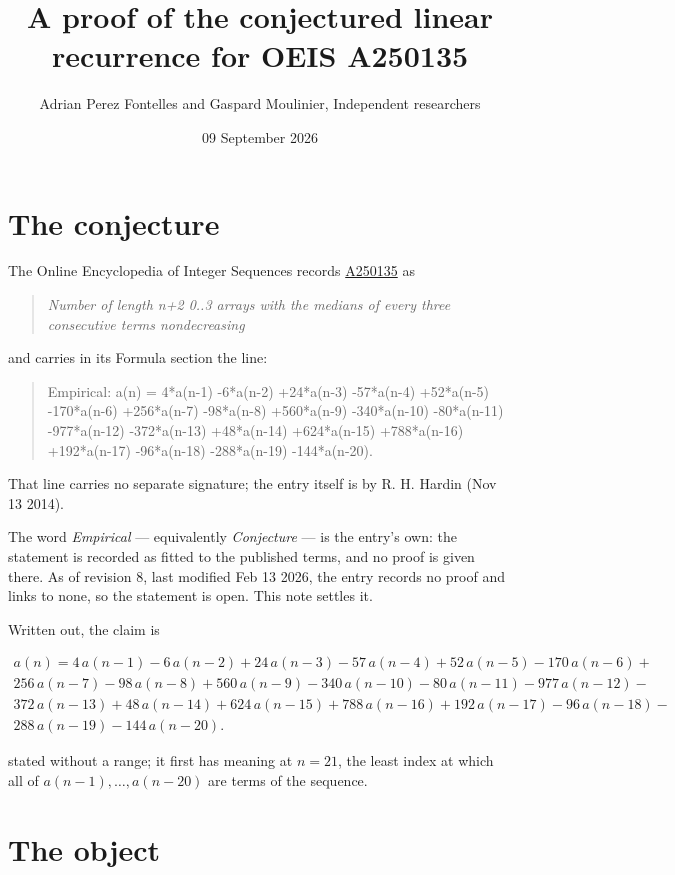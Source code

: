 \documentclass[11pt]{article}
\title{A proof of the conjectured linear recurrence for OEIS A250135}
\author{Adrian Perez Fontelles and Gaspard Moulinier, Independent researchers}
\date{09 September 2026}
\theoremstyle{definition}
\begin{document}
\maketitle
\section{The conjecture}

The Online Encyclopedia of Integer Sequences records \href{https://oeis.org/A250135}{A250135} as

\begin{quote}\itshape Number of length n+2 0..3 arrays with the medians of every three consecutive terms nondecreasing\end{quote}

and carries in its Formula section the line:

\begin{quote}\ttfamily Empirical: a(n) = 4*a(n-1) -6*a(n-2) +24*a(n-3) -57*a(n-4) +52*a(n-5) -170*a(n-6) +256*a(n-7) -98*a(n-8) +560*a(n-9) -340*a(n-10) -80*a(n-11) -977*a(n-12) -372*a(n-13) +48*a(n-14) +624*a(n-15) +788*a(n-16) +192*a(n-17) -96*a(n-18) -288*a(n-19) -144*a(n-20).\end{quote}

That line carries no separate signature; the entry itself is by R. H. Hardin (Nov 13 2014).

The word {\itshape Empirical} --- equivalently {\itshape Conjecture} --- is the entry's own: the statement is recorded as fitted to the published terms, and no proof is given there. As of revision 8, last modified Feb 13 2026, the entry records no proof and links to none, so the statement is open. This note settles it.

Written out, the claim is

\begin{multline*} a(n) = 4\,a(n-1) - 6\,a(n-2) + 24\,a(n-3) - 57\,a(n-4) + 52\,a(n-5) - 170\,a(n-6) + \\ 256\,a(n-7) - 98\,a(n-8) + 560\,a(n-9) - 340\,a(n-10) - 80\,a(n-11) - 977\,a(n-12) - \\ 372\,a(n-13) + 48\,a(n-14) + 624\,a(n-15) + 788\,a(n-16) + 192\,a(n-17) - 96\,a(n-18) - \\ 288\,a(n-19) - 144\,a(n-20). \end{multline*}

stated without a range; it first has meaning at $n = 21$, the least index at which all of $a(n-1),\dots,a(n-20)$ are terms of the sequence.

\section{The object}
\end{document}
